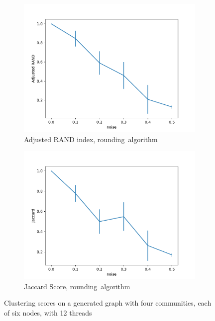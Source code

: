\begin{figure}
\begin{center}
\begin{subfigure}[b]{0.4\textwidth}
		\end{subfigure}
		\begin{subfigure}[b]{0.4\textwidth}
			\centering
			\includegraphics[width=\textwidth]{tex/out/synthetic_12t/model2_noise_adj_rand.pdf}
			\caption{Adjusted RAND index, \mbox{rounding algorithm}}
			\label{fig:tex/out/synthetic_exact/model2_noise_adj_rand.pdf}
		\end{subfigure}
		\quad
		\begin{subfigure}[b]{0.4\textwidth}
			\centering
			\includegraphics[width=\textwidth]{tex/out/synthetic_12t/model2_noise_jaccard.pdf}
			\caption{Jaccard Score, \mbox{rounding algorithm}}
			\label{fig:tex/out/synthetic_exact/_noise_jaccard.pdf}
		\end{subfigure}
	\end{center}
	\caption{Clustering scores on a generated graph with four communities, each
		of six nodes, with 12 threads}
	\label{fig:clustering-mip-rounding}
\end{figure}

